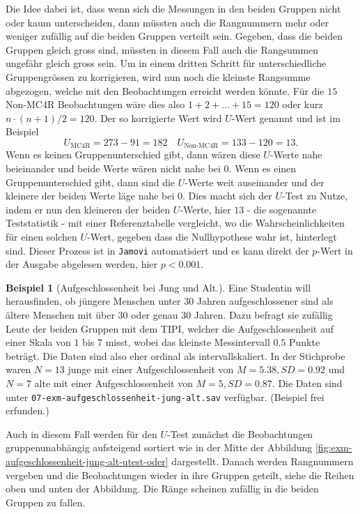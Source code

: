 \documentclass[
]{book}
\theoremstyle{definition}
\theoremstyle{definition}
\newtheorem{example}{Beispiel}[chapter]
\theoremstyle{definition}
\theoremstyle{definition}
\theoremstyle{remark}
\begin{document}
Die Idee dabei ist, dass wenn sich die Messungen in den beiden Gruppen nicht oder kaum unterscheiden, dann müssten auch die Rangnummern mehr oder weniger zufällig auf die beiden Gruppen verteilt sein. Gegeben, dass die beiden Gruppen gleich gross sind, müssten in diesem Fall auch die Rangsummen ungefähr gleich gross sein. Um in einem dritten Schritt für unterschiedliche Gruppengrössen zu korrigieren, wird nun noch die kleinste Rangsumme abgezogen, welche mit den Beobachtungen erreicht werden könnte. Für die \(15\) Non-MC4R Beobachtungen wäre dies also \(1+2+\ldots+ 15 = 120\) oder kurz \(n\cdot (n+1)/2 = 120\). Der so korrigierte Wert wird \(U\)-Wert genannt und ist im Beispiel
\[U_\text{MC4R} = 273 - 91 = 182 \quad U_\text{Non-MC4R} = 133-120 = 13.\]
Wenn es keinen Gruppenunterschied gibt, dann wären diese \(U\)-Werte nahe beieinander und beide Werte wären nicht nahe bei \(0\). Wenn es einen Gruppenunterschied gibt, dann sind die \(U\)-Werte weit auseinander und der kleinere der beiden Werte läge nahe bei \(0\). Dies macht sich der \(U\)-Test zu Nutze, indem er nun den kleineren der beiden \(U\)-Werte, hier \(13\) - die sogenannte Teststatistik - mit einer Referenztabelle vergleicht, wo die Wahrscheinlichkeiten für einen solchen \(U\)-Wert, gegeben dass die Nullhypothese wahr ist, hinterlegt sind. Dieser Prozess ist in \texttt{Jamovi} automatisiert und es kann direkt der \(p\)-Wert in der Ausgabe abgelesen werden, hier \(p < 0.001\).

\begin{example}[Aufgeschlossenheit bei Jung und Alt.]
\protect\hypertarget{exm:aufgeschlossenheit-jung-alt}{}\label{exm:aufgeschlossenheit-jung-alt}Eine Studentin will herausfinden, ob jüngere Menschen unter \(30\) Jahren aufgeschlossener sind als ältere Menschen mit über \(30\) oder genau \(30\) Jahren. Dazu befragt sie zufällig Leute der beiden Gruppen mit dem TIPI, welcher die Aufgeschlossenheit auf einer Skala von \(1\) bis \(7\) misst, wobei das kleinste Messintervall \(0.5\) Punkte beträgt. Die Daten sind also eher ordinal als intervallskaliert. In der Stichprobe waren \(N = 13\) junge mit einer Aufgeschlossenheit von \(M = 5.38, SD = 0.92\) und \(N = 7\) alte mit einer Aufgeschlossenheit von \(M = 5, SD = 0.87\). Die Daten sind unter \texttt{07-exm-aufgeschlossenheit-jung-alt.sav} verfügbar. (Beispiel frei erfunden.)
\end{example}

Auch in diesem Fall werden für den \(U\)-Test zunächst die Beobachtungen gruppenunabhängig aufsteigend sortiert wie in der Mitte der Abbildung \ref{fig:exm-aufgeschlossenheit-jung-alt-utest-oder} dargestellt. Danach werden Rangnummern vergeben und die Beobachtungen wieder in ihre Gruppen geteilt, siehe die Reihen oben und unten der Abbildung. Die Ränge scheinen zufällig in die beiden Gruppen zu fallen.
\end{document}
